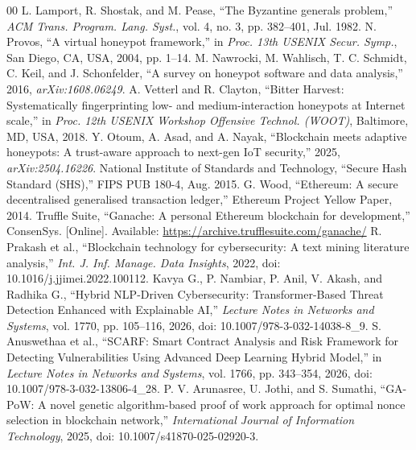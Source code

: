 \documentclass[conference]{IEEEtran}
\begin{document}
{\begin{thebibliography}{00}
 L. Lamport, R. Shostak, and M. Pease, ``The Byzantine generals problem,'' \emph{ACM Trans. Program. Lang. Syst.}, vol. 4, no. 3, pp. 382--401, Jul. 1982.
 N. Provos, ``A virtual honeypot framework,'' in \emph{Proc. 13th USENIX Secur. Symp.}, San Diego, CA, USA, 2004, pp. 1--14.
 M. Nawrocki, M. Wahlisch, T. C. Schmidt, C. Keil, and J. Schonfelder, ``A survey on honeypot software and data analysis,'' 2016, \emph{arXiv:1608.06249}.
 A. Vetterl and R. Clayton, ``Bitter Harvest: Systematically fingerprinting low- and medium-interaction honeypots at Internet scale,'' in \emph{Proc. 12th USENIX Workshop Offensive Technol. (WOOT)}, Baltimore, MD, USA, 2018.
 Y. Otoum, A. Asad, and A. Nayak, ``Blockchain meets adaptive honeypots: A trust-aware approach to next-gen IoT security,'' 2025, \emph{arXiv:2504.16226}.
 National Institute of Standards and Technology, ``Secure Hash Standard (SHS),'' FIPS PUB 180-4, Aug. 2015.
 G. Wood, ``Ethereum: A secure decentralised generalised transaction ledger,'' Ethereum Project Yellow Paper, 2014.
 Truffle Suite, ``Ganache: A personal Ethereum blockchain for development,'' ConsenSys. [Online]. Available: \url{https://archive.trufflesuite.com/ganache/}
 R. Prakash et al., ``Blockchain technology for cybersecurity: A text mining literature analysis,'' \emph{Int. J. Inf. Manage. Data Insights}, 2022, doi: 10.1016/j.jjimei.2022.100112.
 Kavya G., P. Nambiar, P. Anil, V. Akash, and Radhika G., ``Hybrid NLP-Driven Cybersecurity: Transformer-Based Threat Detection Enhanced with Explainable AI,'' \emph{Lecture Notes in Networks and Systems}, vol. 1770, pp. 105--116, 2026, doi: 10.1007/978-3-032-14038-8\_9.
 S. Anuswethaa et al., ``SCARF: Smart Contract Analysis and Risk Framework for Detecting Vulnerabilities Using Advanced Deep Learning Hybrid Model,'' in \emph{Lecture Notes in Networks and Systems}, vol. 1766, pp. 343--354, 2026, doi: 10.1007/978-3-032-13806-4\_28.
 P. V. Arunasree, U. Jothi, and S. Sumathi, ``GA-PoW: A novel genetic algorithm-based proof of work approach for optimal nonce selection in blockchain network,'' \emph{International Journal of Information Technology}, 2025, doi: 10.1007/s41870-025-02920-3.
\end{thebibliography}}
\end{document}
